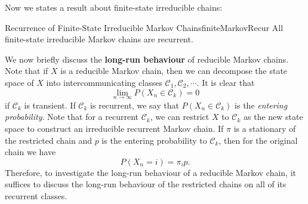 \documentclass[math, code]{amznotes}
\theoremstyle{remark}
\begin{document}
Now we states a result about finite-state irreducible chains:
\begin{probox}{Recurrence of Finite-State Irreducible Markov Chains}{finiteMarkovRecur}
    All finite-state irreducible Markov chains are recurrent.
\end{probox}
We now briefly discuss the \textbf{long-run behaviour} of reducible Markov chains. Note that if $X$ is a reducible Markov chain, then we can decompose the state space of $X$ into intercommunicating classes $\mathcal{C}_1, \mathcal{C}_2, \cdots$. It is clear that 
\begin{equation*}
    \lim_{n \to \infty}P\left(X_n \in \mathcal{C}_k\right) = 0
\end{equation*}
if $\mathcal{C}_k$ is transient. If $\mathcal{C}_k$ is recurrent, we say that $P\left(X_n \in \mathcal{C}_k\right)$ is the \textit{entering probability}. Note that for a recurrent $\mathcal{C}_k$, we can restrict $X$ to $\mathcal{C}_k$ as the new state space to construct an irreducible recurrent Markov chain. If $\pi$ is a stationary of the restricted chain and $p$ is the entering probability to $\mathcal{C}_k$, then for the original chain we have 
\begin{equation*}
    P\left(X_n = i\right) = \pi_ip.
\end{equation*}
Therefore, to investigate the long-run behaviour of a reducible Markov chain, it suffices to discuss the long-run behaviour of the restricted chains on all of its recurrent classes.
\end{document}
